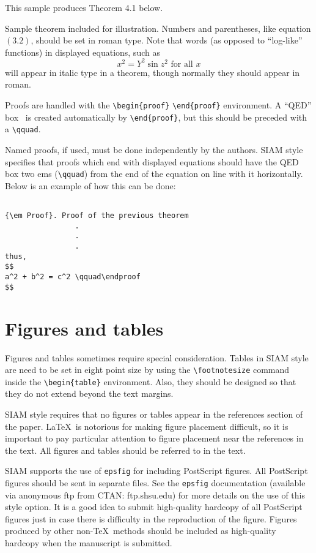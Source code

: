 \documentclass[final,leqno,onefignum,onetabnum]{siamltex1213}
\begin{document}
This sample produces Theorem 4.1 below.

\begin{theorem}
Sample theorem included for illustration.  
Numbers and parentheses, like equation $(3.2)$, should be set 
in roman type.  Note that words (as opposed to ``log-like''
functions) in displayed equations, such as
$$ x^2 = Y^2 \sin z^2 \mbox{ for all } x $$
will appear in italic type in a theorem, though normally
they should appear in roman.
\end{theorem}


Proofs are handled with the \verb|\begin{proof}|
\verb|\end{proof}| environment. A ``QED'' box \endproof\ is created
automatically by \verb|\end{proof}|, but this should be
preceded with a \verb|\qquad|.

Named proofs, if used, must be done independently by the
authors. SIAM style specifies that proofs which end with
displayed equations should have the QED box two ems (\verb|\qquad|)
from the end of the equation on line with it horizontally.
Below is an example of how this can be done:

\begin{verbatim}

{\em Proof}. Proof of the previous theorem 
                .
                .
                .
thus,
$$
a^2 + b^2 = c^2 \qquad\endproof
$$

\end{verbatim}


\section{Figures and tables}
Figures and tables sometimes require special consideration.
Tables in SIAM style are need to be set in eight point size
by using the \verb|\footnotesize| command inside the 
\verb|\begin{table}| environment. Also, they should be designed 
so that they do not extend beyond the text margins. 

SIAM style requires that no figures or tables  appear in the
references section of the paper. \LaTeX\ is notorious for
making figure placement difficult, so it is important to
pay particular attention to figure placement near the
references in the text. All figures and tables should
be referred to in the text.

SIAM supports the use of {\tt epsfig} for including {\sc PostScript}
figures. All {\sc Post\-Script} figures should be sent in separate
files. See the {\tt epsfig} documentation (available via
anonymous ftp from CTAN: ftp.shsu.edu) for more details on the use
of this style option. It is a good idea to submit high-quality
hardcopy of all {\sc Post\-Script} figures just in case there 
is difficulty in the reproduction of the figure. Figures produced 
by other non-\TeX\ methods should be included as high-quality 
hardcopy when  the manuscript is submitted.
\end{document}

